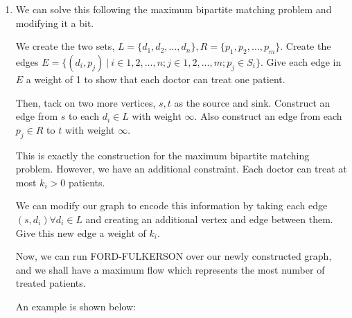 \documentclass[12pt,letterpaper]{article}
\begin{document}
\begin{enumerate}
    \item
      We can solve this following the maximum bipartite matching problem and modifying it a bit.

      We create the two sets, $L = \{d_1, d_2, \dots, d_n\}, R = \{p_1, p_2, \dots, p_m\}$.
      Create the edges $E = \{(d_i, p_j) \ | \ i \in 1, 2, \dots, n; j \in 1, 2, \dots, m; p_j \in S_i\}$.
      Give each edge in $E$ a weight of 1 to show that each doctor can treat one patient.

      Then, tack on two more vertices, $s, t$ as the source and sink.
      Construct an edge from $s$ to each $d_i \in L$ with weight $\infty$.
      Also construct an edge from each $p_j \in R$ to $t$ with weight $\infty$.

      This is exactly the construction for the maximum bipartite matching problem. However, we have an additional constraint. Each doctor can treat at most $k_i > 0$ patients.

      We can modify our graph to encode this information by taking each edge $(s, d_i) \forall d_i \in L$ and creating an additional vertex and edge between them. Give this new edge a weight of $k_i$.

      Now, we can run FORD-FULKERSON over our newly constructed graph,
      and we shall have a maximum flow which represents the most number of treated patients.

      An example is shown below:


\end{enumerate}
\end{document}
